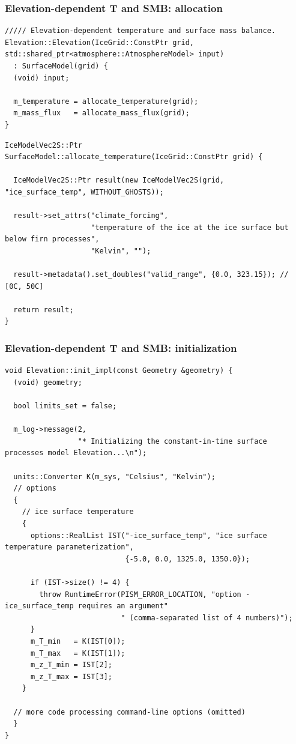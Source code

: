 \documentclass[hide notes,intlimits]{beamer}
\begin{document}
\begin{frame}[fragile]
  \frametitle{Elevation-dependent T and SMB: allocation}

\begin{lstlisting}
///// Elevation-dependent temperature and surface mass balance.
Elevation::Elevation(IceGrid::ConstPtr grid, std::shared_ptr<atmosphere::AtmosphereModel> input)
  : SurfaceModel(grid) {
  (void) input;

  m_temperature = allocate_temperature(grid);
  m_mass_flux   = allocate_mass_flux(grid);
}
\end{lstlisting}

\begin{lstlisting}
IceModelVec2S::Ptr SurfaceModel::allocate_temperature(IceGrid::ConstPtr grid) {

  IceModelVec2S::Ptr result(new IceModelVec2S(grid, "ice_surface_temp", WITHOUT_GHOSTS));

  result->set_attrs("climate_forcing",
                    "temperature of the ice at the ice surface but below firn processes",
                    "Kelvin", "");

  result->metadata().set_doubles("valid_range", {0.0, 323.15}); // [0C, 50C]

  return result;
}
\end{lstlisting}
\end{frame}

\begin{frame}
  \frametitle{Elevation-dependent T and SMB: initialization}

\begin{lstlisting}
void Elevation::init_impl(const Geometry &geometry) {
  (void) geometry;

  bool limits_set = false;

  m_log->message(2,
                 "* Initializing the constant-in-time surface processes model Elevation...\n");

  units::Converter K(m_sys, "Celsius", "Kelvin");
  // options
  {
    // ice surface temperature
    {
      options::RealList IST("-ice_surface_temp", "ice surface temperature parameterization",
                            {-5.0, 0.0, 1325.0, 1350.0});

      if (IST->size() != 4) {
        throw RuntimeError(PISM_ERROR_LOCATION, "option -ice_surface_temp requires an argument"
                           " (comma-separated list of 4 numbers)");
      }
      m_T_min   = K(IST[0]);
      m_T_max   = K(IST[1]);
      m_z_T_min = IST[2];
      m_z_T_max = IST[3];
    }

  // more code processing command-line options (omitted)
  }
}

\end{lstlisting}
\end{frame}
\end{document}
